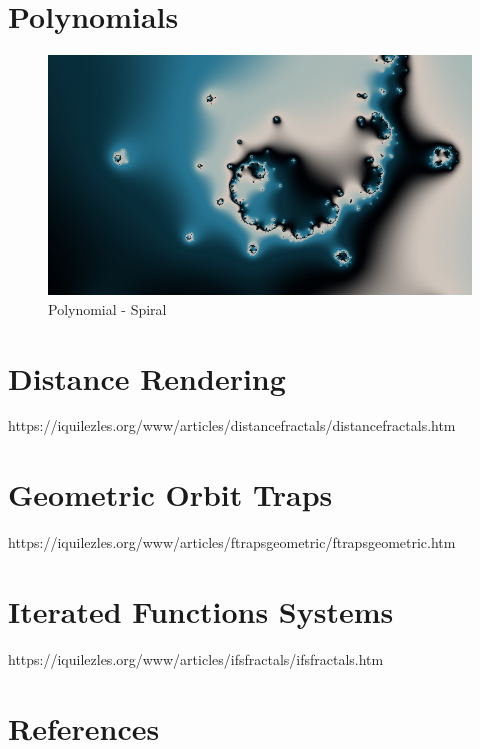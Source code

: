 \documentclass[11pt]{article}
\makeatletter
\def\maxwidth{\ifdim\Gin@nat@width>\linewidth\linewidth
    \else\Gin@nat@width\fi}
\let\Oldincludegraphics\includegraphics
\renewcommand{\includegraphics}[1]{\Oldincludegraphics[width=.8\maxwidth]{#1}}
\makeatother
\begin{document}
    \hypertarget{polynomials}{%
\section{Polynomials}\label{polynomials}}

    \begin{figure}[h]
\centering
\includegraphics{img/poly1.png}
\caption{Polynomial - Spiral}
\end{figure}

    \hypertarget{distance-rendering}{%
\section{Distance Rendering}\label{distance-rendering}}

    https://iquilezles.org/www/articles/distancefractals/distancefractals.htm

    \hypertarget{geometric-orbit-traps}{%
\section{Geometric Orbit Traps}\label{geometric-orbit-traps}}

    https://iquilezles.org/www/articles/ftrapsgeometric/ftrapsgeometric.htm

    \hypertarget{iterated-functions-systems}{%
\section{Iterated Functions Systems}\label{iterated-functions-systems}}

    https://iquilezles.org/www/articles/ifsfractals/ifsfractals.htm

    \hypertarget{references}{%
\section{References}\label{references}}


    
    
    
    
\end{document}
